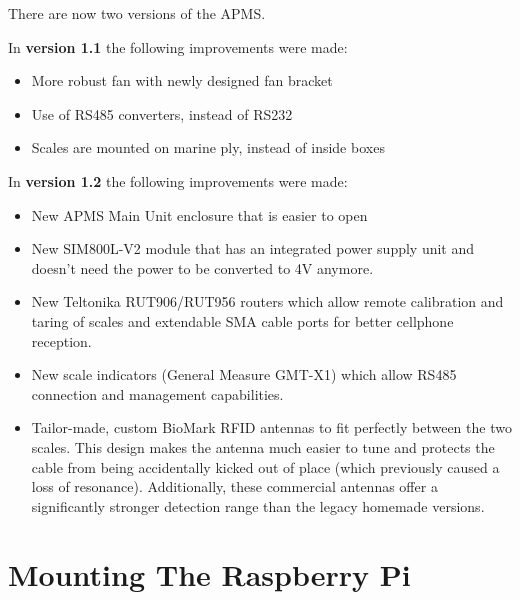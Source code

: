 \documentclass[
  letterpaper,
]{scrbook}
\providecommand{\tightlist}{%
  \setlength{\itemsep}{0pt}\setlength{\parskip}{0pt}}
\begin{document}
\begin{tcolorbox}[enhanced jigsaw, left=2mm, toptitle=1mm, breakable, opacitybacktitle=0.6, title=\textcolor{quarto-callout-note-color}{\faInfo}\hspace{0.5em}{Note}, colback=white, opacityback=0, rightrule=.15mm, leftrule=.75mm, colbacktitle=quarto-callout-note-color!10!white, bottomtitle=1mm, titlerule=0mm, coltitle=black, colframe=quarto-callout-note-color-frame, arc=.35mm, bottomrule=.15mm, toprule=.15mm]

There are now two versions of the APMS.

In \textbf{version 1.1} the following improvements were made:

\begin{itemize}
\tightlist
\item
  More robust fan with newly designed fan bracket
\item
  Use of RS485 converters, instead of RS232
\item
  Scales are mounted on marine ply, instead of inside boxes
\end{itemize}

In \textbf{version 1.2} the following improvements were made:

\begin{itemize}
\tightlist
\item
  New APMS Main Unit enclosure that is easier to open
\item
  New SIM800L-V2 module that has an integrated power supply unit and
  doesn't need the power to be converted to 4V anymore.
\item
  New Teltonika RUT906/RUT956 routers which allow remote calibration and
  taring of scales and extendable SMA cable ports for better cellphone
  reception.
\item
  New scale indicators (General Measure GMT-X1) which allow RS485
  connection and management capabilities.
\item
  Tailor-made, custom BioMark RFID antennas to fit perfectly between the
  two scales. This design makes the antenna much easier to tune and
  protects the cable from being accidentally kicked out of place (which
  previously caused a loss of resonance). Additionally, these commercial
  antennas offer a significantly stronger detection range than the
  legacy homemade versions.
\end{itemize}

\end{tcolorbox}

\section{Mounting The Raspberry Pi}\label{mounting-the-raspberry-pi}
\end{document}
